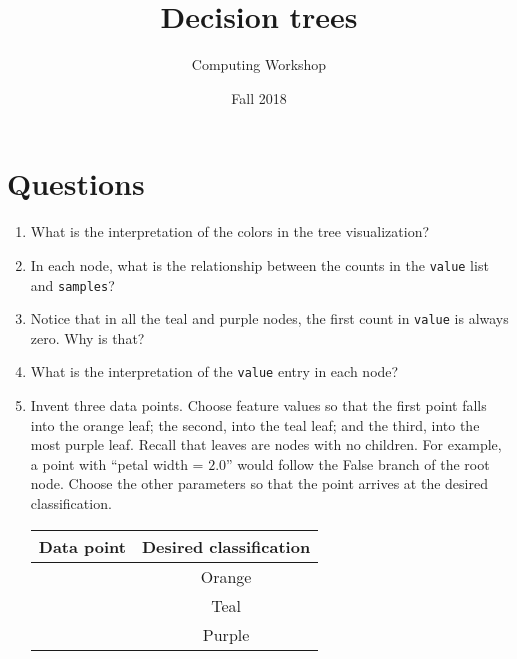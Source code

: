 \documentclass[11pt]{article}
\author{Computing Workshop}
\title{Decision trees}
\date{Fall 2018}
\begin{document}
\maketitle

\section*{Questions}

\begin{enumerate}
\item
  What is the interpretation of the colors in the tree visualization?
  \vspace{2em}

\item
  In each node, what is the relationship between the counts in the
  \texttt{value} list and \texttt{samples}?
  \vspace{2em}

\item
  Notice that in all the teal and purple nodes, the first count in
  \texttt{value} is always zero. Why is that?
  \vspace{2em}

\item
  What is the interpretation of the \texttt{value} entry in each node?
  \vspace{2em}

\item
  Invent three data points.
  Choose feature values so that the first point falls into the orange leaf; the
  second, into the teal leaf; and the third, into the most purple leaf. Recall
  that leaves are nodes with no children.
  For example, a point with ``petal width = $2.0$'' would follow the False
  branch of the root node. Choose the other parameters so that the point arrives
  at the desired classification.

  \begin{center}
    \renewcommand{\arraystretch}{1.5}
    \begin{tabular}{|p{14em}|c|}
      \hline %
      \textbf{Data point} & \textbf{Desired classification} \\ \hline
      ~ & Orange \\ \hline
      ~ & Teal \\ \hline
      ~ & Purple \\ \hline
    \end{tabular}
  \end{center}
\end{enumerate}
\end{document}
